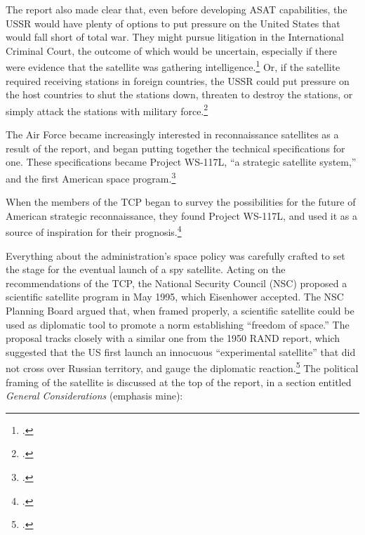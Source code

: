 \documentclass{report}
\begin{document}
The report also made clear that, even before developing ASAT capabilities, the USSR would have plenty of options to put pressure on the United States that would fall short of total war. They might pursue litigation in the International Criminal Court, the outcome of which would be uncertain, especially if there were evidence that the satellite was gathering intelligence.\footcite[p.~16]{kecskemetic_satellite_1950} Or, if the satellite required receiving stations in foreign countries, the USSR could put pressure on the host countries to shut the stations down, threaten to destroy the stations, or simply attack the stations with military force.\footcite[p.~16-17. Importantly, these are all things that the Soviet Union could have done with the U-2 spy plane as well. The US was somewhat more circumspect with its overflights, but the options were there. As it turned out, the first spy satellite, CORONA, ejected a film capsule and required no such receiving stations.]{kecskemetic_satellite_1950}

The Air Force became increasingly interested in reconnaissance satellites as a result of the report, and began putting together the technical specifications for one. These specifications became Project WS-117L, ``a strategic satellite system,'' and the first American space program.\footcite[p.~110-111. The WS is short for ``Weapons System.'']{mcdougall_heavens_1985}

When the members of the TCP began to survey the possibilities for the future of American strategic reconnaissance, they found Project WS-117L, and used it as a source of inspiration for their prognosis.\footcite[p.~197]{brugioni_eyes_2010}

Everything about the administration's space policy was carefully crafted to set the stage for the eventual launch of a spy satellite. Acting on the recommendations of the TCP, the National Security Council (NSC) proposed a scientific satellite program in May 1995, which Eisenhower accepted. The NSC Planning Board argued that, when framed properly, a scientific satellite could be used as diplomatic tool to promote a norm establishing ``freedom of space.'' The proposal tracks closely with a similar one from the 1950 RAND report, which suggested that the US first launch an innocuous ``experimental satellite'' that did not cross over Russian territory, and gauge the diplomatic reaction.\footcite[p.~21]{kecskemetic_satellite_1950} The political framing of the satellite is discussed at the top of the report, in a section entitled \emph{General Considerations} (emphasis mine):
\end{document}
